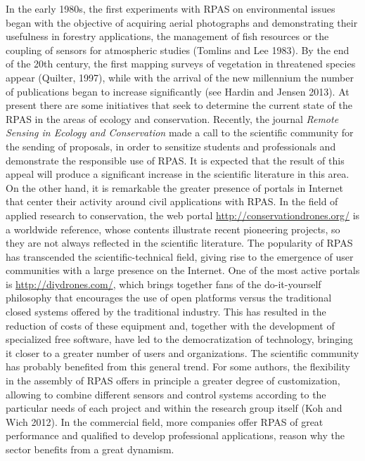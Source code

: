 \documentclass[]{interact}
\theoremstyle{plain}%
\theoremstyle{definition}
\theoremstyle{remark}
\begin{document}
In the early 1980s, the first experiments with RPAS on environmental
issues began with the objective of acquiring aerial photographs and
demonstrating their usefulness in forestry applications, the management
of fish resources or the coupling of sensors for atmospheric studies
(Tomlins and Lee 1983). By the end of the 20th century, the first
mapping surveys of vegetation in threatened species appear (Quilter,
1997), while with the arrival of the new millennium the number of
publications began to increase significantly (see Hardin and Jensen
2013). At present there are some initiatives that seek to determine the
current state of the RPAS in the areas of ecology and conservation.
Recently, the journal \emph{Remote Sensing in Ecology and Conservation}
made a call to the scientific community for the sending of proposals, in
order to sensitize students and professionals and demonstrate the
responsible use of RPAS. It is expected that the result of this appeal
will produce a significant increase in the scientific literature in this
area. On the other hand, it is remarkable the greater presence of
portals in Internet that center their activity around civil applications
with RPAS. In the field of applied research to conservation, the web
portal \url{http://conservationdrones.org/} is a worldwide reference,
whose contents illustrate recent pioneering projects, so they are not
always reflected in the scientific literature. The popularity of RPAS
has transcended the scientific-technical field, giving rise to the
emergence of user communities with a large presence on the Internet. One
of the most active portals is \url{http://diydrones.com/}, which brings
together fans of the do-it-yourself philosophy that encourages the use
of open platforms versus the traditional closed systems offered by the
traditional industry. This has resulted in the reduction of costs of
these equipment and, together with the development of specialized free
software, have led to the democratization of technology, bringing it
closer to a greater number of users and organizations. The scientific
community has probably benefited from this general trend. For some
authors, the flexibility in the assembly of RPAS offers in principle a
greater degree of customization, allowing to combine different sensors
and control systems according to the particular needs of each project
and within the research group itself (Koh and Wich 2012). In the
commercial field, more companies offer RPAS of great performance and
qualified to develop professional applications, reason why the sector
benefits from a great dynamism.
\end{document}
